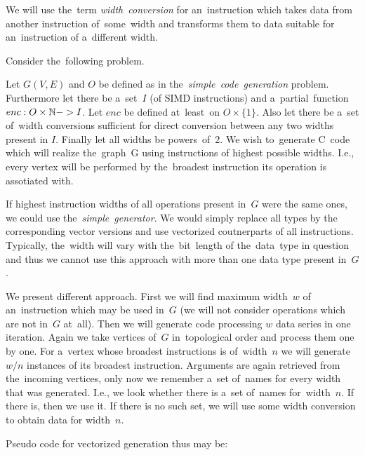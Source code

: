 \begin{define}
  We will use the~term \emph{width~conversion} for an~instruction which takes data from another instruction of~some~width and transforms them to data suitable for an~instruction of a~different width. 
\end{define}

Consider the~following problem.

\begin{problem}
  Let $G(V,E)$ and $O$ be defined as in the~\emph{simple~code~generation} problem. Furthermore let there be a~set~$I$ (of SIMD instructions) and a~partial~function $enc: O \times \mathbb{N} -> I$. Let $enc$ be defined at~least~on $O \times \{1\}$. Also let there be a~set of~width conversions sufficient for direct conversion between any two widths present in $I$. Finally let all widths be powers~of~2. We wish to~generate C~code which will realize the~graph~G using instructions of highest possible widths. I.e., every vertex will be performed by the~broadest instruction its operation is assotiated with. 
\end{problem}

If highest instruction widths of all operations present in~$G$ were the same ones, we could use the~\emph{simple~generator}. We would simply replace all types by the corresponding vector versions and use vectorized coutnerparts of all instructions. Typically, the~width will vary with the~bit~length of the~data~type in question and thus we cannot use this approach with more than one data type present in~$G$.

\parspace

We present different approach. First we will find maximum width~$w$ of an~instruction which may be used in~$G$ (we will not consider operations which are not in~$G$ at~all). Then we will generate code processing $w$ data series in one iteration. Again we take vertices of~$G$ in~topological order and process them one by one. For a~vertex whose broadest instructions is of~width~$n$ we will generate $w/n$ instances of its broadest instruction. Arguments are again retrieved from the~incoming vertices, only now we remember a~set of~names for every width that was generated. I.e., we look whether there is a~set of~names for~width~$n$. If there is, then we use it. If there is no such set, we will use some width conversion to obtain data for width~$n$. 

\parspace

Pseudo code for vectorized generation thus may be:


